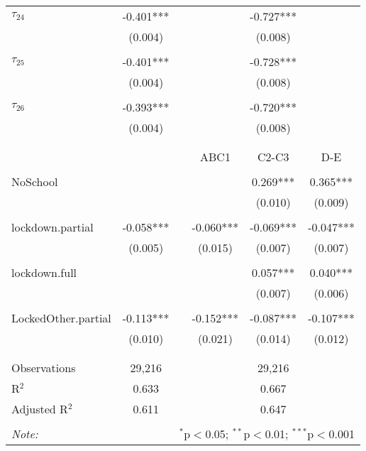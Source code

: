 \begin{tabular}{@{\extracolsep{-2pt}}lccccc}
$\tau_{24}$ & -0.401*** &&      & -0.727*** &            \\
            &  (0.004)  &&      &  (0.008)  &            \\
            &           &&      &           &            \\[-2.1ex]
$\tau_{25}$ & -0.401*** &&      & -0.728*** &            \\
            &  (0.004)  &&      &  (0.008)  &            \\
            &           &&      &           &            \\[-2.1ex]
$\tau_{26}$ & -0.393*** &&      & -0.720*** &            \\
            &  (0.004)  &&      &  (0.008)  &            \\
            &           &&      &           &            \\[-2.1ex]
\cline{4-6} \cline{10-12} \\ [-1ex]      
                    &           &&    ABC1   &   C2-C3   &    D-E    \\\\[-.7ex]  
NoSchool            &           &&           &  0.269*** &  0.365*** \\
                    &           &&           &   (0.010) &   (0.009) \\
                    &           &&           &           &           \\[-2.1ex]
lockdown.partial    & -0.058*** && -0.060*** & -0.069*** & -0.047*** \\
                    &  (0.005)  &&  (0.015)  &  (0.007)  &  (0.007)  \\
                    &           &&           &           &           \\[-2.1ex]
lockdown.full       &           &&           &  0.057*** &  0.040*** \\
                    &           &&           &   (0.007) &   (0.006) \\
                    &           &&           &           &           \\[-2.1ex]
LockedOther.partial & -0.113*** && -0.152*** & -0.087*** & -0.107*** \\
                    &  (0.010)  &&  (0.021)  &  (0.014)  &  (0.012)  \\
                    &           &&           &           &           \\[-2.1ex]
\hline \\[-1.8ex] 
Observations     &  29,216 && \multicolumn{3}{c}{29,216}  \\ 
R$^{2}$          &   0.633 && \multicolumn{3}{c}{ 0.667}  \\ 
Adjusted R$^{2}$ &   0.611 && \multicolumn{3}{c}{ 0.647}  \\ 
\hline 
\hline \\[-1.8ex] 
\textit{Note:}  & \multicolumn{5}{r}{$^{*}$p$<$0.05; $^{**}$p$<$0.01; $^{***}$p$<$0.001} \\ 
\end{tabular} 


% 
